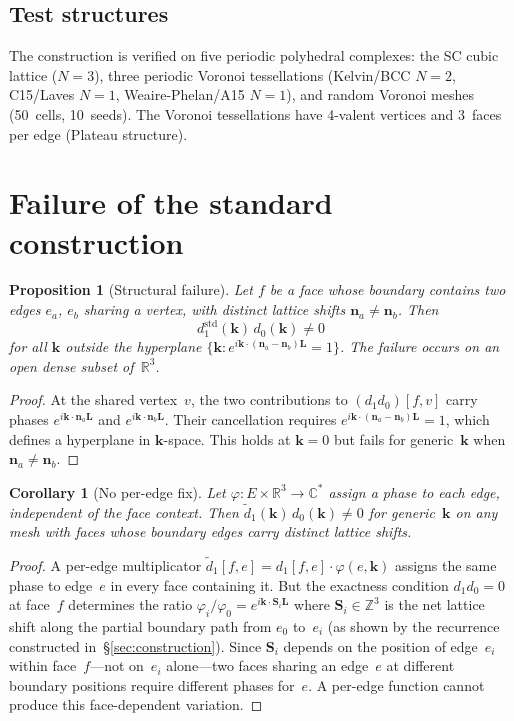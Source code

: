 \documentclass[11pt]{article}
\newtheorem{proposition}[theorem]{Proposition}
\newtheorem{corollary}[theorem]{Corollary}
\theoremstyle{remark}
\newcommand{\bk}{\mathbf{k}}
\newcommand{\bL}{\mathbf{L}}
\newcommand{\bn}{\mathbf{n}}
\newcommand{\bS}{\mathbf{S}}
\newcommand{\CC}{\mathbb{C}}
\newcommand{\RR}{\mathbb{R}}
\newcommand{\ZZ}{\mathbb{Z}}
\begin{document}
\subsection{Test structures}

The construction is verified on five periodic polyhedral complexes: the
SC cubic lattice ($N=3$), three periodic Voronoi tessellations
(Kelvin/BCC $N=2$, C15/Laves $N=1$, Weaire-Phelan/A15 $N=1$), and
random Voronoi meshes (50~cells, 10~seeds). The Voronoi tessellations
have 4-valent vertices and 3~faces per edge (Plateau structure).

\section{Failure of the standard construction}\label{sec:failure}

\begin{proposition}[Structural failure]\label{prop:failure}
Let $f$ be a face whose boundary contains two edges $e_a$, $e_b$ sharing
a vertex, with distinct lattice shifts $\bn_a \neq \bn_b$. Then
\[
d_1^{\mathrm{std}}(\bk)\,d_0(\bk) \neq 0
\]
for all $\bk$ outside the hyperplane
$\{\bk : e^{i\bk\cdot(\bn_a - \bn_b)\bL} = 1\}$. The failure occurs on
an open dense subset of~$\RR^3$.
\end{proposition}

\begin{proof}
At the shared vertex~$v$, the two contributions to $(d_1 d_0)[f,v]$
carry phases $e^{i\bk\cdot\bn_a\bL}$ and $e^{i\bk\cdot\bn_b\bL}$. Their
cancellation requires $e^{i\bk\cdot(\bn_a-\bn_b)\bL} = 1$, which defines
a hyperplane in $\bk$-space. This holds at $\bk = 0$ but fails for
generic~$\bk$ when $\bn_a \neq \bn_b$.
\end{proof}

\begin{corollary}[No per-edge fix]\label{cor:nofix}
Let $\varphi\colon E \times \RR^3 \to \CC^*$ assign a phase to each edge,
independent of the face context. Then
$\tilde{d}_1(\bk)\,d_0(\bk) \neq 0$ for generic~$\bk$ on any mesh with
faces whose boundary edges carry distinct lattice shifts.
\end{corollary}

\begin{proof}
A per-edge multiplicator $\tilde{d}_1[f,e] = d_1[f,e]\cdot\varphi(e,\bk)$
assigns the same phase to edge~$e$ in every face containing it. But the
exactness condition $d_1 d_0 = 0$ at face~$f$ determines the ratio
$\varphi_i/\varphi_0 = e^{i\bk\cdot\bS_i\bL}$ where $\bS_i \in \ZZ^3$
is the net lattice shift along the partial boundary path from $e_0$
to~$e_i$ (as shown by the recurrence constructed in~\S\ref{sec:construction}).
Since $\bS_i$ depends on the position of edge~$e_i$ within face~$f$---not
on~$e_i$ alone---two faces sharing an edge~$e$ at different boundary
positions require different phases for~$e$. A per-edge function cannot
produce this face-dependent variation.
\end{proof}
\end{document}
